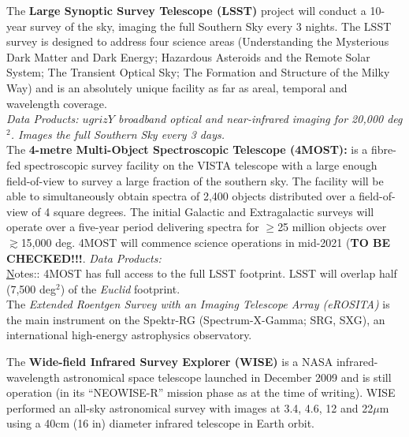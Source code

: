 \documentclass[oneside, a4paper, onecolumn, 11pt]{article}
\begin{document}
\begin{framed}
The {\bf Large Synoptic Survey Telescope (LSST)} project will conduct
a 10-year survey of the sky, imaging the full Southern Sky every 3
nights. The LSST survey is designed to address four science areas
(Understanding the Mysterious Dark Matter and Dark Energy; Hazardous
Asteroids and the Remote Solar System; The Transient Optical Sky; The
Formation and Structure of the Milky Way) and is an absolutely unique
facility as far as areal, temporal and wavelength coverage.\\
{\it Data Products: $ugrizY$ broadband optical and near-infrared imaging for 20,000 deg$^2$. 
Images the full Southern Sky every 3 days. } \\

The {\bf 4-metre Multi-Object Spectroscopic Telescope  (4MOST):} 
is a fibre-fed spectroscopic survey facility on the VISTA telescope with a large enough field-of-view to survey a large fraction of the southern sky. The facility will be able to simultaneously obtain spectra of 2,400 objects distributed over a field-of-view of 4 square degrees. 
The initial Galactic and Extragalactic surveys will operate over a five-year period delivering spectra for $\geq$25 million objects over 
$\gtrsim$15,000 deg. 4MOST will commence science operations in mid-2021 ({\bf TO BE CHECKED!!!}. 
{\it Data Products: } \\

{\underline Notes::} 4MOST has full access to the full LSST footprint. LSST will overlap half (7,500 deg$^2$) of the {\it Euclid} footprint. \\

The {\it Extended Roentgen Survey with an Imaging Telescope Array (eROSITA)} is the main instrument on the 
Spektr-RG (Spectrum-X-Gamma; SRG, SXG), an international high-energy astrophysics observatory. 

\hrulefill 

The {\bf Wide-field Infrared Survey Explorer (WISE)} is a NASA
infrared-wavelength astronomical space telescope launched in December
2009 and is still operation (in its ``NEOWISE-R'' mission phase as at
the time of writing). WISE performed an all-sky astronomical survey
with images at 3.4, 4.6, 12 and 22$\mu$m using a 40cm (16 in) diameter
infrared telescope in Earth orbit. 


\end{framed}
\end{document}
